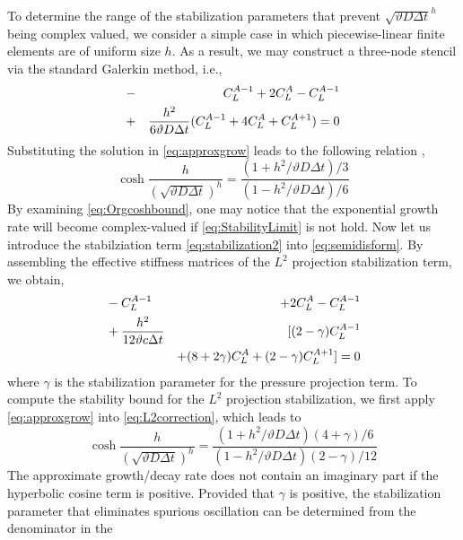 \documentclass[10pt]{elsarticle}
\begin{document}
To determine the range of the stabilization
parameters that prevent $\sqrt{\vartheta D \Delta t}^{h}$ being
complex valued, we consider a simple case in which piecewise-linear
finite elements are of uniform size $h$. As a result, we may construct
a three-node stencil via the standard Galerkin method, i.e.,
\begin{eqnarray}
\label{eq:standardGM}
 &-&C_{L}^{A-1} + 2 C_{L}^{A}  - C_{L}^{A-1} \nonumber \\ 
 &+& \frac{h^{2}}{6 \vartheta D\Delta t  }  \Large( C_{L}^{A-1} + 4 C_{L}^{A} + C_{L}^{A+1} \Large)  = 0  
\end{eqnarray}
Substituting the solution in \eqref{eq:approxgrow} leads to the following relation \citep{Harari:2004}, 
\begin{equation}
  \label{eq:Orgcoshbound} 
  \cosh \frac{h}{(\sqrt{\vartheta D \Delta t})^{h} }= \frac{ (1 + h^2/\vartheta D \Delta t) /3 }{ (1 - h^2/\vartheta D \Delta t) /6}
\end{equation}
By examining \eqref{eq:Orgcoshbound}, one may notice that the exponential growth
rate will become complex-valued if  \eqref{eq:StabilityLimit} is not hold. Now let us introduce the stabilziation term  \eqref{eq:stabilization2} into
\eqref{eq:semidisform}. By assembling the effective stiffness matrices
of the $L^{2}$ projection stabilization term, we obtain,
\begin{eqnarray}
\label{eq:L2correction}
 & -C_{L}^{A-1}  & + 2 C_{L}^{A}  - C_{L}^{A-1} \nonumber \\ 
 &+ \frac{h^{2}}{12 \vartheta c\Delta t  } & \Huge[ (2-\gamma)C_{L}^{A-1}  \nonumber \\
 & & + (8 +2\gamma) C_{L}^{A} + (2-\gamma) C_{L}^{A+1} \Huge]  = 0  
\end{eqnarray}
where $\gamma$ is the stabilization parameter for the pressure
projection term. 
To compute the stability bound for the $L^{2}$ projection stabilization,
we first apply \eqref{eq:approxgrow} into \eqref{eq:L2correction},
which leads to
\begin{equation}
  \label{eq:coshbound} 
  \cosh \frac{h}{(\sqrt{\vartheta D \Delta t})^{h} }= \frac{ (1 + h^2/\vartheta D \Delta t) ( 4 + \gamma)/6}{ (1 - h^2/\vartheta D \Delta t) ( 2 - \gamma)/12}
\end{equation}
The approximate growth/decay rate does not contain an imaginary part
if the hyperbolic cosine term is positive. Provided that $\gamma$ is positive, the stabilization parameter that eliminates
spurious oscillation can be determined from the denominator in the
\end{document}
